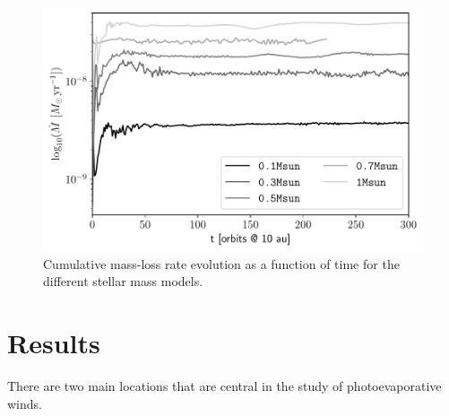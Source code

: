 \documentclass[usenatbib,useAMS,usedcolumn]{mnras}
\begin{document}
\begin{figure}
    \centering
    \includegraphics[width=\columnwidth]{Figure3}
    \caption{Cumulative mass-loss rate evolution as a function of time for the different stellar mass models. \label{fig:mdotevol}}
\end{figure}

\section{Results}\label{sec:results}

There are two main locations that are central in the study of photoevaporative winds.
\end{document}
